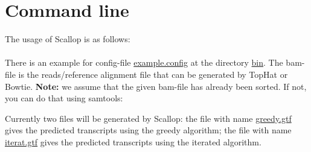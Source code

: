 \documentclass{llncs}
\begin{document}
\section{Command line}
The usage of Scallop is as follows:\\
\\
There is an example for config-file \url{example.config} at the directory \url{bin}.
The bam-file is the reads/reference alignment file that can be generated by TopHat or Bowtie.
{\bf Note:} we assume that the given bam-file has already been sorted.
If not, you can do that using samtools:\\

Currently two files will be generated by Scallop:
the file with name \url{greedy.gtf} gives the predicted transcripts using the greedy algorithm;
the file with name \url{iterat.gtf} gives the predicted transcripts using the iterated
algorithm.
\end{document}
